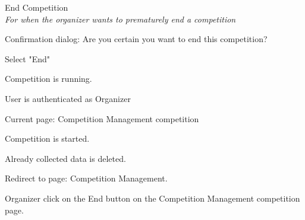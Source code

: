 
\begin{uc}{End Competition}\\
	\emph{For when the organizer wants to prematurely end a competition}
    \begin{uc-mss}
    \item Confirmation dialog: Are you certain you want to end this competition?
    \item Select "End"
    \end{uc-mss}

    \begin{uc-pre}
    \item Competition is running.
    \item User is authenticated as Organizer
    \item Current page: Competition Management {competition}
    \end{uc-pre}

    \begin{uc-post}
    \item Competition is started.
    \item Already collected data is deleted.
    \item Redirect to page: Competition Management.
    \end{uc-post}

    \begin{uc-trig}
        Organizer click on the End button on the Competition Management {competition} page.
    \end{uc-trig}

\end{uc}
